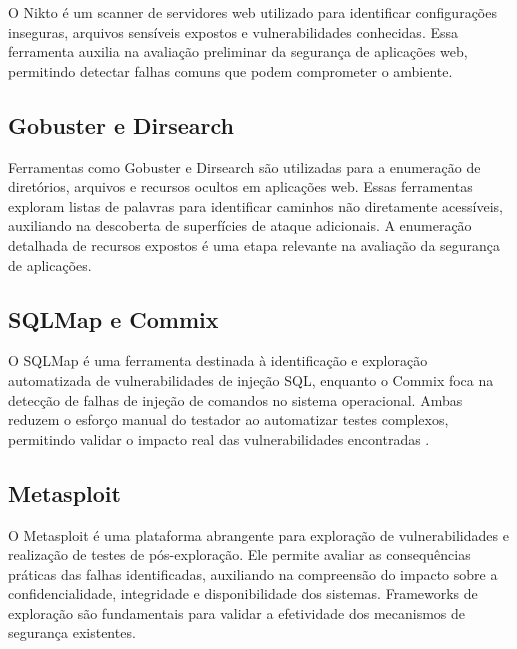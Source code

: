             O Nikto é um scanner de servidores web utilizado para identificar configurações inseguras, arquivos sensíveis expostos e vulnerabilidades conhecidas.
            Essa ferramenta auxilia na avaliação preliminar da segurança de aplicações web, permitindo detectar falhas 
            comuns que podem comprometer o ambiente\citep{moreno2019introduccao}.
        
        \subsection{Gobuster e Dirsearch}

            Ferramentas como Gobuster e Dirsearch são utilizadas para a enumeração de diretórios, arquivos e recursos ocultos em aplicações web.
            Essas ferramentas exploram listas de palavras para identificar caminhos não diretamente acessíveis, auxiliando na descoberta de superfícies
            de ataque adicionais. A enumeração detalhada de recursos expostos é uma etapa relevante na avaliação da 
            segurança de aplicações\citep{stallings2017network}.

        \subsection{SQLMap e Commix}
        
            O SQLMap é uma ferramenta destinada à identificação e exploração automatizada de vulnerabilidades de injeção SQL, enquanto o Commix
            foca na detecção de falhas de injeção de comandos no sistema operacional. Ambas reduzem o esforço manual do testador ao automatizar
            testes complexos, permitindo validar o impacto real das vulnerabilidades encontradas \citep{moreno2019introduccao}.

        \subsection{Metasploit}

            O Metasploit é uma plataforma abrangente para exploração de vulnerabilidades e realização de testes de pós-exploração.
            Ele permite avaliar as consequências práticas das falhas identificadas, auxiliando na compreensão do impacto sobre a
            confidencialidade, integridade e disponibilidade dos sistemas. Frameworks de exploração são 
            fundamentais para validar a efetividade dos mecanismos de segurança existentes\citep{stallings2017network}.

